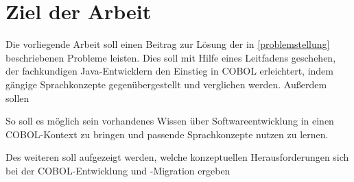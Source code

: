 \section{Ziel der Arbeit}

Die vorliegende Arbeit soll einen Beitrag zur Lösung der in \autoref{problemstellung} beschriebenen Probleme leisten. Dies soll mit Hilfe eines Leitfadens geschehen, der fachkundigen Java-Entwicklern den Einstieg in COBOL erleichtert, indem gängige Sprachkonzepte gegenübergestellt und verglichen werden. Außerdem sollen 

So soll es möglich sein vorhandenes Wissen über Softwareentwicklung in einen COBOL-Kontext zu bringen und passende Sprachkonzepte nutzen zu lernen. 

Des weiteren soll aufgezeigt werden, welche konzeptuellen Herausforderungen sich bei der COBOL-Entwicklung und -Migration ergeben